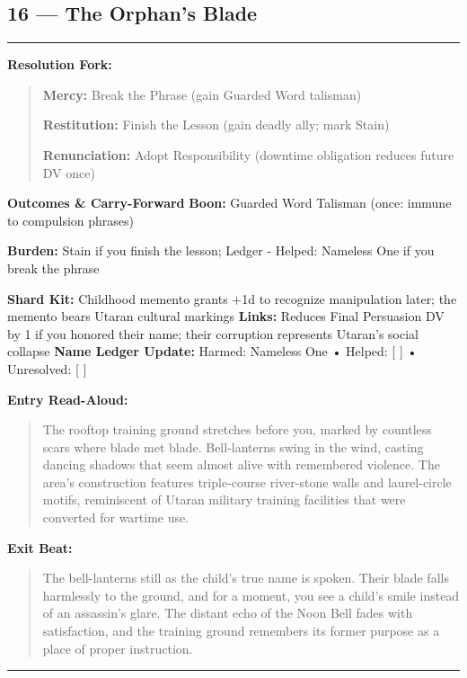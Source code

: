 \documentclass[18pt, letterpaper, twoside]{article}
\newenvironment{floorbox}[1]{%
    \begin{center}
    \begin{minipage}{0.95\textwidth}
    \subsection*{#1}
    \vspace{-0.5em}
    \rule{\textwidth}{0.5pt}
    \vspace{0.5em}
}{%
    \vspace{0.5em}
    \rule{\textwidth}{0.5pt}
    \end{minipage}
    \end{center}
}
\newenvironment{resolutionbox}{%
    \vspace{0.5em}
    \noindent\textbf{Resolution Fork:}
    \begin{quote}
}{%
    \end{quote}
    \vspace{0.5em}
}
\newenvironment{boxedtext}[1]{%
    \vspace{0.5em}
    \noindent\textbf{#1}
    \begin{quote}
}{%
    \end{quote}
    \vspace{0.5em}
}
\newcommand{\boon}[1]{\noindent\textbf{Boon:} #1\par}
\newcommand{\burden}[1]{\noindent\textbf{Burden:} #1\par}
\newcommand{\entrytext}[1]{\begin{boxedtext}{Entry Read-Aloud:} #1 \end{boxedtext}}
\newcommand{\exittext}[1]{\begin{boxedtext}{Exit Beat:} #1 \end{boxedtext}}
\begin{document}
\begin{floorbox}{16 --- The Orphan's Blade}
\begin{resolutionbox}
\textbf{Mercy:} Break the Phrase (gain Guarded Word talisman)

\textbf{Restitution:} Finish the Lesson (gain deadly ally; mark Stain)

\textbf{Renunciation:} Adopt Responsibility (downtime obligation reduces future DV once)
\end{resolutionbox}

\textbf{Outcomes \& Carry-Forward}
\boon{Guarded Word Talisman (once: immune to compulsion phrases)}
\burden{Stain if you finish the lesson; Ledger - Helped: Nameless One if you break the phrase}
\textbf{Shard Kit:} Childhood memento grants +1d to recognize manipulation later; the memento bears Utaran cultural markings
\textbf{Links:} Reduces Final Persuasion DV by 1 if you honored their name; their corruption represents Utaran's social collapse
\textbf{Name Ledger Update:} Harmed: Nameless One • Helped: [ ] • Unresolved: [ ]

\entrytext{The rooftop training ground stretches before you, marked by countless scars where blade met blade. Bell-lanterns swing in the wind, casting dancing shadows that seem almost alive with remembered violence. The area's construction features triple-course river-stone walls and laurel-circle motifs, reminiscent of Utaran military training facilities that were converted for wartime use.}

\exittext{The bell-lanterns still as the child's true name is spoken. Their blade falls harmlessly to the ground, and for a moment, you see a child's smile instead of an assassin's glare. The distant echo of the Noon Bell fades with satisfaction, and the training ground remembers its former purpose as a place of proper instruction.}
\end{floorbox}
\end{document}
